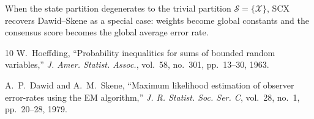 When the state partition degenerates to the trivial partition
$\mathcal{S} = \{\mathcal{X}\}$, SCX recovers Dawid--Skene as a special case:
weights become global constants and the consensus score becomes the global
average error rate.

\begin{thebibliography}{10}
W.~Hoeffding, ``Probability inequalities for sums of bounded random variables,''
\emph{J. Amer. Statist. Assoc.}, vol.~58, no.~301, pp.~13--30, 1963.

A.~P.~Dawid and A.~M.~Skene, ``Maximum likelihood estimation of observer
error-rates using the EM algorithm,''
\emph{J. R. Statist. Soc. Ser. C}, vol.~28, no.~1, pp.~20--28, 1979.
\end{thebibliography}

\endinput
